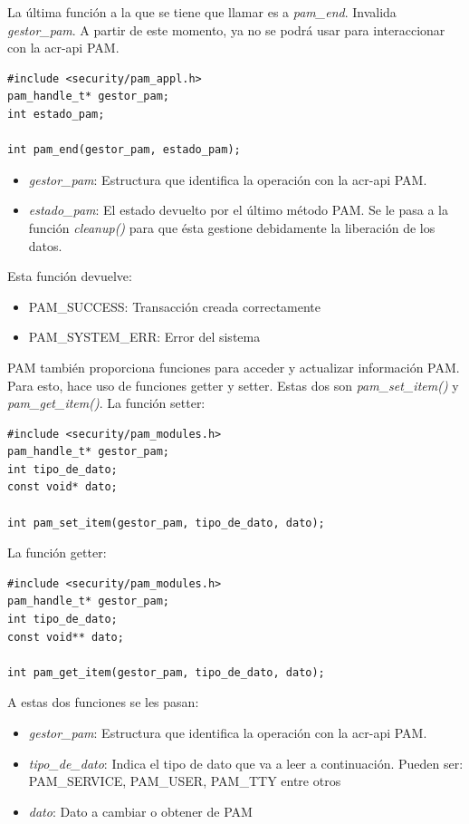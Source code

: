 \documentclass[titlepage, 12pt, a4paper]{article}
\begin{document}
La última función a la que se tiene que llamar es a \textit{pam\_end}. Invalida \textit{gestor\_pam}. A partir de este momento, ya no se podrá usar para interaccionar con la \gls{acr-api} PAM.
\begin{lstlisting}
#include <security/pam_appl.h>
pam_handle_t* gestor_pam;
int estado_pam;

int pam_end(gestor_pam, estado_pam);
\end{lstlisting}
\begin{itemize}
	\item{\textit{gestor\_pam}: Estructura que identifica la operación con la \gls{acr-api} PAM.}
	\item{\textit{estado\_pam}: El estado devuelto por el último método PAM. Se le pasa a la función \textit{cleanup()} para que ésta gestione debidamente la liberación de los datos.}
\end{itemize}
Esta función devuelve:
\begin{itemize}
	\item{PAM\_SUCCESS: Transacción creada correctamente}
	\item{PAM\_SYSTEM\_ERR: Error del sistema}
\end{itemize} \par
PAM también proporciona funciones para acceder y actualizar información PAM. Para esto, hace uso de funciones getter y setter. Estas dos son \textit{pam\_set\_item()} y \textit{pam\_get\_item()}.
La función setter:
\begin{lstlisting}
#include <security/pam_modules.h>
pam_handle_t* gestor_pam;
int tipo_de_dato;
const void* dato;

int pam_set_item(gestor_pam, tipo_de_dato, dato);
\end{lstlisting}
La función getter:
\begin{lstlisting}
#include <security/pam_modules.h>
pam_handle_t* gestor_pam;
int tipo_de_dato;
const void** dato;

int pam_get_item(gestor_pam, tipo_de_dato, dato);
\end{lstlisting}
A estas dos funciones se les pasan:
\begin{itemize}
	\item{\textit{gestor\_pam}: Estructura que identifica la operación con la \gls{acr-api} PAM.}
	\item{\textit{tipo\_de\_dato}: Indica el tipo de dato que va a leer a continuación. Pueden ser: PAM\_SERVICE, PAM\_USER, PAM\_TTY entre otros}
	\item{\textit{dato}: Dato a cambiar o obtener de PAM}
\end{itemize}
\end{document}
